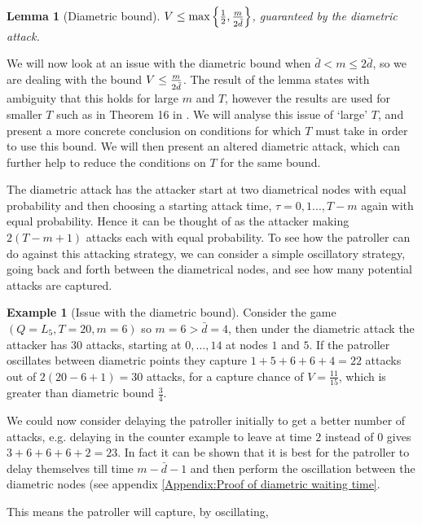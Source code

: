 \documentclass[a4paper,10pt]{article}
\newtheorem{lemma}[theorem]{Lemma}
\theoremstyle{definition}
\theoremstyle{definition}
\newtheorem{example}[theorem]{Example}
\theoremstyle{remark}
\theoremstyle{definition}
\begin{document}
\begin{lemma}[Diametric bound]
$V \leq \max \left\{ \frac{1}{2},\frac{m}{\raisebox{-0.5ex}{$\scriptstyle 2 \bar{d}$}} \right\}$, guaranteed by the diametric attack.
\end{lemma}

We will now look at an issue with the diametric bound when $\bar{d} < m \leq 2 \bar{d}$, so we are dealing with the bound $V \leq \frac{m}{\raisebox{-0.5ex}{$\scriptstyle 2 \bar{d}$}}$. The result of the lemma states with ambiguity that this holds for large $m$ and $T$, however the results are used for smaller $T$ such as in Theorem 16 in \citep{Alpern2011}. We will analyse this issue of `large' $T$,  and present a more concrete conclusion on conditions for which $T$ must take in order to use this bound. We will then present an altered diametric attack, which can further help to reduce the conditions on $T$ for the same bound.

The diametric attack has the attacker start at two diametrical nodes with equal probability and then choosing a starting attack time, $\tau=0,1...,T-m$ again with equal probability. Hence it can be thought of as the attacker making $2(T-m+1)$ attacks each with equal probability. To see how the patroller can do against this attacking strategy, we can consider a simple oscillatory strategy, going back and forth between the diametrical nodes, and see how many potential attacks are captured.

\begin{example}[Issue with the diametric bound]
Consider the game $(Q=L_{5},T=20,m=6)$ so $m=6 >\bar{d}=4$, then under the diametric attack the attacker has $30$ attacks, starting at $0,...,14$ at nodes $1$ and $5$. If the patroller oscillates between diametric points they capture
$1+5+6+6+4=22$ attacks out of $2(20-6+1)=30$ attacks, for a capture chance of $V=\frac{11}{15}$, which is greater than diametric bound $\frac{3}{4}$.
\end{example}

We could now consider delaying the patroller initially to get a better number of attacks, e.g. delaying in the counter example to leave at time $2$ instead of $0$ gives $3+6+6+6+2=23$. In fact it can be shown that it is best for the patroller to delay themselves till time $m-\bar{d}-1$ and then perform the oscillation between the diametric nodes (see appendix \ref{Appendix:Proof of diametric waiting time}.

This means the patroller will capture, by oscillating,
\end{document}
